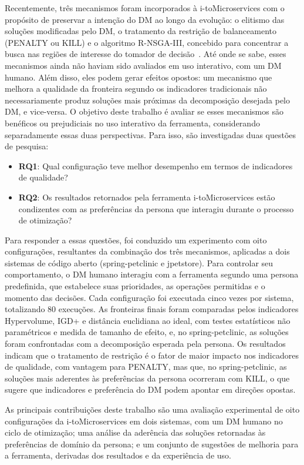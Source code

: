 \documentclass[conference]{IEEEtran}
\newcommand{\itm}{\mbox{i-toMicroservices}}
\begin{document}
Recentemente, três mecanismos foram incorporados à \itm{} com o propósito de preservar a intenção do DM ao longo da evolução: o elitismo das soluções modificadas pelo DM, o tratamento da restrição de balanceamento (PENALTY ou KILL) e o algoritmo R-NSGA-III, concebido para concentrar a busca nas regiões de interesse do tomador de decisão~\cite{vesikar2018}. Até onde se sabe, esses mecanismos ainda não haviam sido avaliados em uso interativo, com um DM humano. Além disso, eles podem gerar efeitos opostos: um mecanismo que melhora a qualidade da fronteira segundo os indicadores tradicionais não necessariamente produz soluções mais próximas da decomposição desejada pelo DM, e vice-versa. O objetivo deste trabalho é avaliar se esses mecanismos são benéficos ou prejudiciais no uso interativo da ferramenta, considerando separadamente essas duas perspectivas. Para isso, são investigadas duas questões de pesquisa:

\begin{itemize}
\item \textbf{RQ1}: Qual configuração teve melhor desempenho em termos de indicadores de qualidade?
\item \textbf{RQ2}: Os resultados retornados pela ferramenta \itm{} estão condizentes com as preferências da persona que interagiu durante o processo de otimização?
\end{itemize}

Para responder a essas questões, foi conduzido um experimento com oito configurações, resultantes da combinação dos três mecanismos, aplicadas a dois sistemas de código aberto (spring-petclinic e jpetstore). Para controlar seu comportamento, o DM humano interagiu com a ferramenta segundo uma persona predefinida, que estabelece suas prioridades, as operações permitidas e o momento das decisões. Cada configuração foi executada cinco vezes por sistema, totalizando 80 execuções. As fronteiras finais foram comparadas pelos indicadores Hypervolume, IGD+ e distância euclidiana ao ideal, com testes estatísticos não paramétricos e medida de tamanho de efeito, e, no spring-petclinic, as soluções foram confrontadas com a decomposição esperada pela persona. Os resultados indicam que o tratamento de restrição é o fator de maior impacto nos indicadores de qualidade, com vantagem para PENALTY, mas que, no spring-petclinic, as soluções mais aderentes às preferências da persona ocorreram com KILL, o que sugere que indicadores e preferência do DM podem apontar em direções opostas.

As principais contribuições deste trabalho são uma avaliação experimental de oito configurações da \itm{} em dois sistemas, com um DM humano no ciclo de otimização; uma análise da aderência das soluções retornadas às preferências de domínio da persona; e um conjunto de sugestões de melhoria para a ferramenta, derivadas dos resultados e da experiência de uso.
\end{document}

